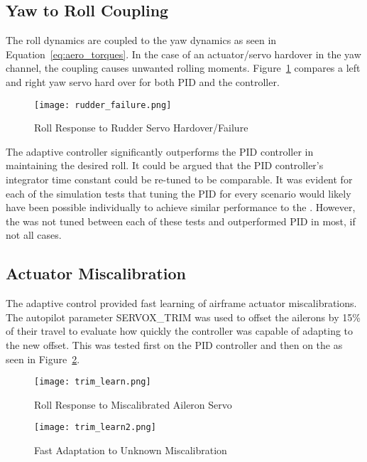 \subsection{Yaw to Roll Coupling}
The roll dynamics are coupled to the yaw dynamics as seen in Equation~\ref{eq:aero_torques}.  In the case of an actuator/servo hardover in the yaw channel, the coupling causes unwanted rolling moments.  Figure~\ref{fig:rudder_failure} compares a left and right yaw servo hard over for both \ac{PID} and the \Lone controller.
\begin{figure}[h!]
 \centering
  \texttt{[image: rudder\_failure.png]}
  \caption{Roll Response to Rudder Servo Hardover/Failure}
  \label{fig:rudder_failure}
\end{figure}
The adaptive controller significantly outperforms the \ac{PID} controller in maintaining the desired roll.  It could be argued that the \ac{PID} controller's integrator time constant could be re-tuned to be comparable.  It was evident for each of the simulation tests that tuning the \ac{PID} for every scenario would likely have been possible individually to achieve similar performance to the \Lone.  However, the \Lone was not tuned between each of these tests and outperformed \ac{PID} in most, if not all cases.

\subsection{Actuator Miscalibration}
The \Lone adaptive control provided fast learning of airframe actuator miscalibrations.  The autopilot parameter SERVOX\_TRIM was used to offset the ailerons by 15\% of their travel to evaluate how quickly the controller was capable of adapting to the new offset.  This was tested first on the \ac{PID} controller and then on the \Lone as seen in Figure~\ref{fig:trim_learn}.
\begin{figure}[h!]
 \centering
  \texttt{[image: trim\_learn.png]}
  \caption{Roll Response to Miscalibrated Aileron Servo}
  \label{fig:trim_learn}
\end{figure}
\begin{figure}[h!]
 \centering
  \texttt{[image: trim\_learn2.png]}
  \caption{\Lone Fast Adaptation to Unknown Miscalibration}
  \label{fig:trim_learn2}
\end{figure}

